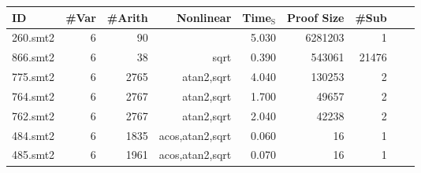\begin{table}
  \begin{center}
\begin{tabular}{|l||r|r|r||r|r|r|r|r|}
\hline
ID & \#Var & \#Arith & Nonlinear & Time$_{\text{S}}$ & Proof Size & \#Sub \\
\hline
\hline
260.smt2 & 6 & 90 &  & 5.030 & 6281203 & 1 \\
866.smt2 & 6 & 38 & sqrt & 0.390 & 543061 & 21476 \\
775.smt2 & 6 & 2765 & atan2,sqrt & 4.040 & 130253 & 2 \\
764.smt2 & 6 & 2767 & atan2,sqrt & 1.700 & 49657 & 2 \\
762.smt2 & 6 & 2767 & atan2,sqrt & 2.040 & 42238 & 2 \\
484.smt2 & 6 & 1835 & acos,atan2,sqrt & 0.060 & 16 & 1 \\
485.smt2 & 6 & 1961 & acos,atan2,sqrt & 0.070 & 16 & 1 \\

\end{tabular}
\end{center}
\end{table}
